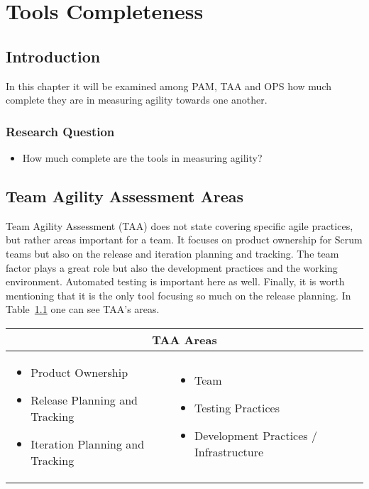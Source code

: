 \chapter{Tools Completeness}
\label{ch:tools_completness}

\section{Introduction}
In this chapter it will be examined among PAM, TAA and OPS how much complete they are in measuring agility towards one another.

\subsection{Research Question}
\begin{itemize}
	\item How much complete are the tools in measuring agility?
\end{itemize}

\section{Team Agility Assessment Areas}
Team Agility Assessment (TAA) does not state covering specific agile practices, but rather areas important for a team. It focuses on product ownership for Scrum teams but also on the release and iteration planning and tracking. The team factor plays a great role but also the development practices and the working environment. Automated testing is important here as well. Finally, it is worth mentioning that it is the only tool focusing so much on the release planning. In Table~\ref{table:taa_practices} one can see TAA's areas.

\begin{table}
  \begin{tabular}{| p{5cm} p{5cm} |}
    \hline
    \multicolumn{2}{|c|}{\textbf{TAA Areas}}  \\ \hline
     \begin{itemize} \item Product Ownership \item Release Planning and Tracking \item Iteration Planning and Tracking \end{itemize} &
     \begin{itemize}  \item Team \item Testing Practices \item Development Practices / Infrastructure \end{itemize}  \\ \hline
  \end{tabular}
  \label{table:taa_practices}
\end{table}

